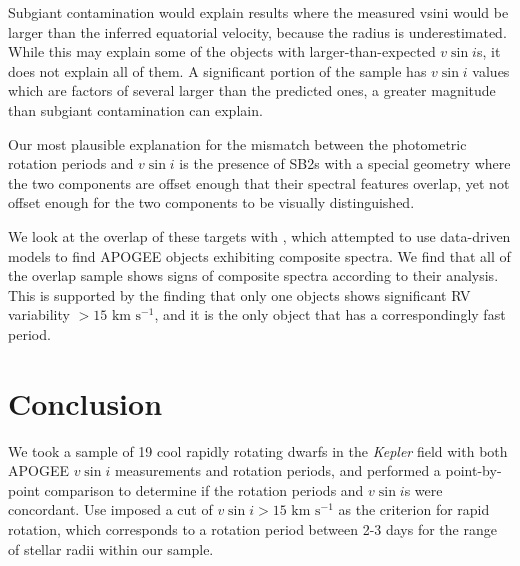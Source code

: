 \documentclass[manuscript]{aastex6}
\newcommand{\vsini}{\ensuremath{v \sin i}}
\newcommand{\Kepler}{\mbox{\textit{Kepler}}}
\newcommand{\kms}{\textrm{ km~s}\ensuremath{^{-1}}}
\newcommand{\gvs}{\authorcomment1}
\begin{document}
Subgiant contamination would explain results where the measured vsini would be
larger than the inferred equatorial velocity, because the radius is
underestimated. While this may explain some of the objects with
larger-than-expected \vsini{}s, it does not explain all of them. A significant
portion of the sample has \vsini{} values which are factors of several larger
than the predicted ones, a greater magnitude than subgiant contamination can 
explain.

Our most plausible explanation for the mismatch between the photometric
rotation periods and \vsini{} is the presence of SB2s with a special geometry
where the two components are offset enough that their spectral features
overlap, yet not offset enough for the two components to be visually
distinguished. 

We look at the overlap of these targets with \citep{ElBadry18}, which attempted
to use data-driven models to find APOGEE objects exhibiting composite spectra. We 
find that all of the overlap sample shows signs of composite spectra according
to their analysis. This is supported by the finding that only one 
objects shows significant RV variability \(> 15 \kms\), and it is \gvs{one of} 
the only object that has a correspondingly fast period.




\section{Conclusion}
\label{sec:conclusions}

We took a sample of 19 cool rapidly rotating dwarfs in the \Kepler{} field with 
both APOGEE \vsini{} measurements and \citet{McQuillan14} rotation periods, and 
performed a point-by-point comparison to determine if the rotation periods and
\vsini{}s were concordant. Use imposed a cut of \(\vsini > 15 \kms\) as the
criterion for rapid rotation, which corresponds to a rotation period between
2-3 days for the range of stellar radii within our sample.
\end{document}
